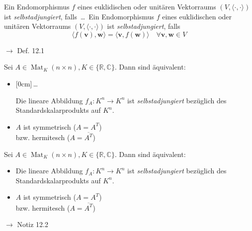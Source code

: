 \documentclass[11pt]{article}
\renewcommand{\cite}[1]{\par\bigskip\hfill{\color{gray}\tiny\(\to\) #1}}
\newcommand{\CC}{\mathbb{C}}
\newcommand{\RR}{\mathbb{R}}
\newcommand*{\scprod}[2]{\langle #1, #2\rangle} %
\renewcommand{\vec}[1]{\mathbf{#1}}
\DeclareMathOperator{\Mat}{Mat}
\newcommand{\hide}[1]{\parbox{0cm}{\raisebox{-7pt}[0cm]{\dots}}\color{white}#1\color{black}}
\let\olddots\dots
\renewcommand{\dots}{\,\olddots\,}
\newenvironment{field}{}{\newpage}
\newif\ifnote
\newenvironment{note}{\notetrue}{\notefalse}
\newcommand{\localtag}{}
\newcommand{\globaltag}{}
\newcommand{\uuid}{}
\newcommand{\tags}[1]{
    \ifnote
        \renewcommand{\localtag}{#1}
    \else
        \renewcommand{\globaltag}{#1}
    \fi
    }
\newcommand{\xplain}[1]{\renewcommand{\uuid}{#1}}
\begin{document}
\begin{note}
    \tags{Def}
    \xplain{f145cd78-c790-11ec-9d64-0242ac120002}

    \begin{field}
        Ein Endomorphismus $f$ eines euklidischen oder unitären Vektorraums $(V, \scprod{\cdot}{\cdot})$ ist \emph{selbstadjungiert}, falls \dots
    \end{field}
    \begin{field}
        Ein Endomorphismus $f$ eines euklidischen oder unitären Vektorraums $(V, \scprod{\cdot}{\cdot})$ ist \emph{selbstadjungiert}, falls
        \[\scprod{f(\vec{v})}{\vec{w}} = \scprod{\vec{v}}{f(\vec{w})} \quad \forall \vec{v,w}\in V\]
        \cite{Def. 12.1}
    \end{field}

    \begin{field}
        Sei $A\in \Mat_K(n\times n), K\in\{\RR,\CC\}$. Dann sind äquivalent:
        \begin{itemize}
            \item \hide{Die lineare Abbildung $f_A: K^n\longrightarrow K^n$ ist \emph{selbstadjungiert} bezüglich des Standardskalarprodukts auf $K^n$.}
            \item $A$ ist symmetrisch ($A = A^T$) \\ bzw. hermitesch ($A = \overline{A^T}$)
        \end{itemize}
    \end{field}
    \begin{field}
        Sei $A\in \Mat_K(n\times n), K\in\{\RR,\CC\}$. Dann sind äquivalent:
        \begin{itemize}
            \item Die lineare Abbildung $f_A: K^n\longrightarrow K^n$ ist \emph{selbstadjungiert} bezüglich des Standardskalarprodukts auf $K^n$.
            \item $A$ ist symmetrisch ($A = A^T$) \\ bzw. hermitesch ($A = \overline{A^T}$)
        \end{itemize}
        \cite{Notiz 12.2}
    \end{field}


\end{note}
\end{document}
